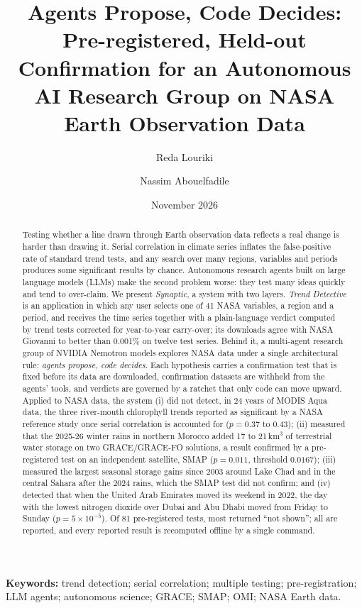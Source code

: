 \documentclass[11pt,a4paper]{article}
\title{\textbf{Agents Propose, Code Decides:\\ Pre-registered, Held-out Confirmation for an Autonomous\\ AI Research Group on NASA Earth Observation Data}}
\author{Reda Louriki}
\author{Nassim Abouelfadile}
\affil{Team Synaptic, Casablanca, Morocco\\
\small NASA International Space Apps Challenge 2026: \emph{Be an Earth System Trend Detective!}}
\date{November 2026}
\newcommand{\km}{\,km$^3$}
\begin{document}
\maketitle

\begin{abstract}
\noindent
Testing whether a line drawn through Earth observation data reflects a real change is harder than drawing it. Serial
correlation in climate series inflates the false-positive rate of standard trend tests, and any search over many
regions, variables and periods produces some significant results by chance. Autonomous research agents built on large
language models (LLMs) make the second problem worse: they test many ideas quickly and tend to over-claim. We present
\emph{Synaptic}, a system with two layers. \emph{Trend Detective} is an application in which any user selects one of
41 NASA variables, a region and a period, and receives the time series together with a plain-language verdict
computed by trend tests corrected for year-to-year carry-over; its downloads agree with NASA Giovanni to better than
0.001\% on twelve test series. Behind it, a multi-agent research group of NVIDIA Nemotron models explores NASA data
under a single architectural rule: \emph{agents propose, code decides}. Each hypothesis carries a confirmation test
that is fixed before its data are downloaded, confirmation datasets are withheld from the agents' tools, and verdicts
are governed by a ratchet that only code can move upward. Applied to NASA data, the system (i) did not detect, in 24
years of MODIS Aqua data, the three river-mouth chlorophyll trends reported as significant by a NASA reference study
once serial correlation is accounted for ($p = 0.37$ to $0.43$); (ii) measured that the 2025-26 winter rains in
northern Morocco added 17 to 21\km{} of terrestrial water storage on two GRACE/GRACE-FO solutions, a result confirmed by
a pre-registered test on an independent satellite, SMAP ($p = 0.011$, threshold $0.0167$); (iii) measured the largest
seasonal storage gains since 2003 around Lake Chad and in the central Sahara after the 2024 rains, which the SMAP test
did not confirm; and (iv) detected that when the United Arab Emirates moved its weekend in 2022, the day with the
lowest nitrogen dioxide over Dubai and Abu Dhabi moved from Friday to Sunday ($p = 5\times10^{-5}$). Of 81
pre-registered tests, most returned ``not shown''; all are reported, and every reported result is recomputed offline
by a single command.
\end{abstract}

\medskip
\noindent\textbf{Keywords:} trend detection; serial correlation; multiple testing; pre-registration; LLM agents;
autonomous science; GRACE; SMAP; OMI; NASA Earth data.
\end{document}
